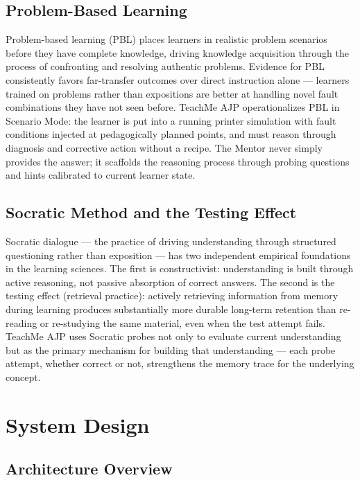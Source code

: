 \documentclass[11pt,letterpaper]{article}
\begin{document}
\subsection{Problem-Based Learning}
Problem-based learning (PBL) places learners in realistic problem scenarios before they have complete knowledge, driving knowledge acquisition through the process of confronting and resolving authentic problems. Evidence for PBL consistently favors far-transfer outcomes over direct instruction alone --- learners trained on problems rather than expositions are better at handling novel fault combinations they have not seen before. TeachMe AJP operationalizes PBL in Scenario Mode: the learner is put into a running printer simulation with fault conditions injected at pedagogically planned points, and must reason through diagnosis and corrective action without a recipe. The Mentor never simply provides the answer; it scaffolds the reasoning process through probing questions and hints calibrated to current learner state.

\subsection{Socratic Method and the Testing Effect}
Socratic dialogue --- the practice of driving understanding through structured questioning rather than exposition --- has two independent empirical foundations in the learning sciences. The first is constructivist: understanding is built through active reasoning, not passive absorption of correct answers. The second is the testing effect (retrieval practice): actively retrieving information from memory during learning produces substantially more durable long-term retention than re-reading or re-studying the same material, even when the test attempt fails. TeachMe AJP uses Socratic probes not only to evaluate current understanding but as the primary mechanism for building that understanding --- each probe attempt, whether correct or not, strengthens the memory trace for the underlying concept.

\section{System Design}
\label{sec:system-design}

\subsection{Architecture Overview}
\label{sec:architecture-overview}
\end{document}
